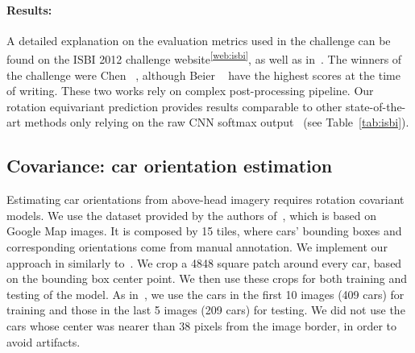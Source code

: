 \documentclass[10pt,twocolumn,letterpaper,table]{article}
\begin{document}
\paragraph{Results:} A detailed explanation on the evaluation metrics used in the challenge can be found on the ISBI 2012 challenge website\textsuperscript{\ref{web:isbi}}, as well as in~\cite{arganda2015crowdsourcing}. The winners of the challenge were Chen \etal~\cite{chen2016deep}, although Beier \etal~\cite{beier2016efficient} have the highest scores at the time of writing.
These two works rely on complex post-processing pipeline. Our rotation equivariant prediction provides results comparable to other state-of-the-art methods only relying on the raw CNN softmax output~\cite{drozdzal2016importance,fakhry2016deep,ronneberger2015u} (see Table~\ref{tab:isbi}).



\subsection{Covariance: car orientation estimation}


Estimating car orientations from above-head imagery requires rotation covariant models. We use the dataset provided by the authors of~\cite{henriques2016warped}, which is based on Google Map images. It is composed by 15 tiles, where cars' bounding boxes and corresponding orientations come from manual annotation. We implement our approach in similarly to~\cite{henriques2016warped}. We crop a 4848 square patch around every car, based on the bounding box center point. We then use these crops for both training and testing of the model. As in~\cite{henriques2016warped}, we use the cars in the first 10 images (409 cars) for training and those in the last 5 images (209 cars) for testing. We did not use the cars whose center was nearer than 38 pixels from the image border, in order to avoid artifacts.
\end{document}
